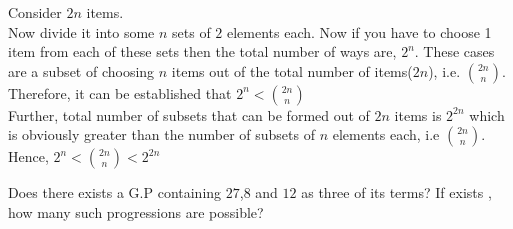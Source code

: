 \begin{solution}
Consider $2n$ items.\\
Now divide it into some $n$ sets of $2$ elements each. Now if you have to choose 1 item from each of these sets then the total number of ways are, $2^n$. These cases are a subset of choosing $n$ items out of the total number of items($2n$), i.e. ${2n}\choose{n}$.\\
Therefore, it can be established that $2^n< $${2n}\choose{n}$\\
Further, total number of subsets that can be formed out of $2n$ items is $2^{2n}$ which is obviously greater than the number of subsets of $n$ elements each, i.e ${2n}\choose{n}$.\\
Hence, $2^n<$${2n}\choose{n}$$<2^{2n}$\\
\end{solution}
\begin{CB}
    Does there exists a G.P containing $27$,$8$ and $12$ as three of its terms? If exists , how many such progressions are possible?
\end{CB}


